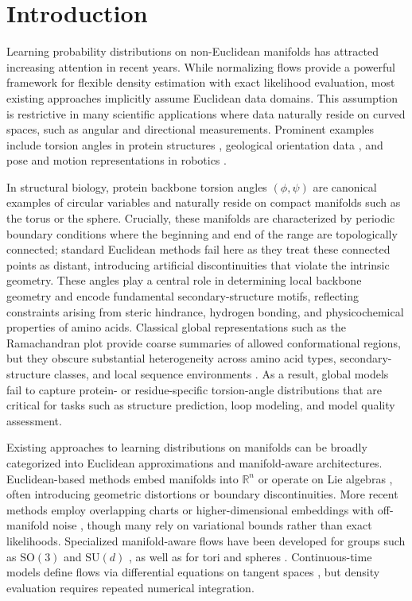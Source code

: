 \documentclass{article}
\begin{document}
\section{Introduction}

Learning probability distributions on non-Euclidean manifolds has attracted increasing attention in recent years. While normalizing flows provide a powerful framework for flexible density estimation with exact likelihood evaluation, most existing approaches implicitly assume Euclidean data domains. This assumption is restrictive in many scientific applications where data naturally reside on curved spaces, such as angular and directional measurements. Prominent examples include torsion angles in protein structures \cite{Hamelryck2006, Mardia2007, Boomsma2008, Shapovalov2011}, geological orientation data \cite{Peel2001}, and pose and motion representations in robotics \cite{Feiten2013,Senanayake2018}.

In structural biology, protein backbone torsion angles $(\phi, \psi)$ are canonical examples of circular variables and naturally reside on compact manifolds such as the torus or the sphere. Crucially, these manifolds are characterized by periodic boundary conditions where the beginning and end of the range are topologically connected; standard Euclidean methods fail here as they treat these connected points as distant, introducing artificial discontinuities that violate the intrinsic geometry. These angles play a central role in determining local backbone geometry and encode fundamental secondary-structure motifs, reflecting constraints arising from steric hindrance, hydrogen bonding, and physicochemical properties of amino acids. Classical global representations such as the Ramachandran plot \cite{Ramachandran1963} provide coarse summaries of allowed conformational regions, but they obscure substantial heterogeneity across amino acid types, secondary-structure classes, and local sequence environments \cite{Hovmoller2002, Jha2005, Berkholz2009, Lennox2009}. As a result, global models fail to capture protein- or residue-specific torsion-angle distributions that are critical for tasks such as structure prediction, loop modeling, and model quality assessment.

Existing approaches to learning distributions on manifolds can be broadly categorized into Euclidean approximations and manifold-aware architectures. Euclidean-based methods embed manifolds into $\mathbb{R}^n$ \cite{Gemici2016} or operate on Lie algebras \cite{Falorsi2019}, often introducing geometric distortions or boundary discontinuities. More recent methods employ overlapping charts \cite{Kalatzis2021} or higher-dimensional embeddings with off-manifold noise \cite{Brofos2021}, though many rely on variational bounds rather than exact likelihoods. Specialized manifold-aware flows have been developed for groups such as $\mathrm{SO}(3)$ and $\mathrm{SU}(d)$ \cite{Boyda2021,Kanwar2020,Liu2023}, as well as for tori and spheres \cite{Bose2020,Rezende2020}. Continuous-time models define flows via differential equations on tangent spaces \cite{Rozen2021,Falorsi2021,DeBortoli2022,Chen2024}, but density evaluation requires repeated numerical integration.
\end{document}
